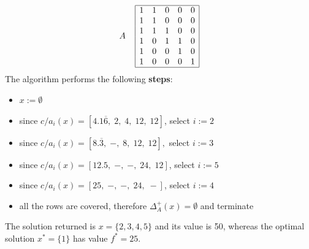 \documentclass[11pt]{article}
\begin{document}
	$$
	A \;\;\;\;
	\begin{array}{| c c c c c |}
		\hline
		1 & 1 & 0 & 0 & 0 \\
		1 & 1 & 0 & 0 & 0 \\
		1 & 1 & 1 & 0 & 0 \\
		1 & 0 & 1 & 1 & 0 \\
		1 & 0 & 0 & 1 & 0 \\
		1 & 0 & 0 & 0 & 1 \\
		\hline
	\end{array}
	$$
	The algorithm performs the following \textbf{steps}:
	\begin{itemize}
		\item $x := \emptyset$
		\item since $c/a_i (x) = [4.1\overline{6}, \; 2, \; 4, \; 12, \; 12 ]$, select $i := 2$
		\item since $c/a_i (x) = [8.\overline{3}, \; -, \; 8, \; 12, \; 12 ],$ select $i := 3$
		\item since $c/a_i (x) = [12.5, \; -, \; -, \; 24, \; 12 ]$, select $i := 5$
		\item since $c/a_i (x) = [25, \; -, \; -, \; 24, \; - ]$, select $i := 4$
		\item all the rows are covered, therefore $\Delta_A^+ (x) = \emptyset$ and terminate
	\end{itemize}
	The solution returned is $x = \{2, 3, 4, 5\}$ and its value is 50, whereas the optimal solution $x^\ast = \{1\}$ has value $f^\ast = 25$.\\
	
	\newpage
	
\end{document}
